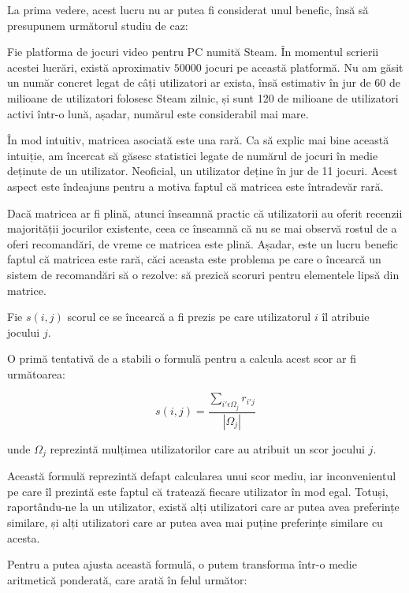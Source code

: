 \documentclass[12pt,a4paper]{report}
\begin{document}
La prima vedere, acest lucru nu ar putea fi considerat unul benefic, însă să presupunem următorul studiu de caz:

\bigskip

Fie platforma de jocuri video pentru PC numită Steam. În momentul scrierii acestei lucrări, există aproximativ \( 50 000 \) jocuri pe această platformă. \cite{29} Nu am găsit un număr concret legat de câți utilizatori ar exista, însă estimativ în jur de 60 de milioane de utilizatori folosesc Steam zilnic, și sunt 120 de milioane de utilizatori activi într-o lună, așadar, numărul este considerabil mai mare.

În mod intuitiv, matricea asociată este una rară. Ca să explic mai bine această intuiție, am încercat să găsesc statistici legate de numărul de jocuri în medie deținute de un utilizator. Neoficial, un utilizator deține în jur de 11 jocuri. Acest aspect este îndeajuns pentru a motiva faptul că matricea este întradevăr rară.

Dacă matricea ar fi plină, atunci înseamnă practic că utilizatorii au oferit recenzii majorității jocurilor existente, ceea ce înseamnă că nu se mai observă rostul de a oferi recomandări, de vreme ce matricea este plină. Așadar, este un lucru benefic faptul că matricea este rară, căci aceasta este problema pe care o încearcă un sistem de recomandări să o rezolve: să prezică scoruri pentru elementele lipsă din matrice.

\bigskip

Fie \( s(i, j) \) scorul ce se încearcă a fi prezis pe care utilizatorul \( i \) îl atribuie jocului \( j \).

\noindent O primă tentativă de a stabili o formulă pentru a calcula acest scor ar fi următoarea:

\[ s(i, j) = \dfrac{ \sum\limits_{i' \epsilon \Omega_{j} } r_{i'j} }{|\Omega_{j}|}\]

unde \( \Omega_{j}\) reprezintă mulțimea utilizatorilor care au atribuit un scor jocului \( j \).

\bigskip

Această formulă reprezintă defapt calcularea unui scor mediu, iar inconvenientul pe care îl prezintă este faptul că tratează fiecare utilizator în mod egal. Totuși, raportându-ne la un utilizator, există alți utilizatori care ar putea avea preferințe similare, și alți utilizatori care ar putea avea mai puține preferințe similare cu acesta.

Pentru a putea ajusta această formulă, o putem transforma într-o medie aritmetică ponderată, care arată în felul următor:
\end{document}
